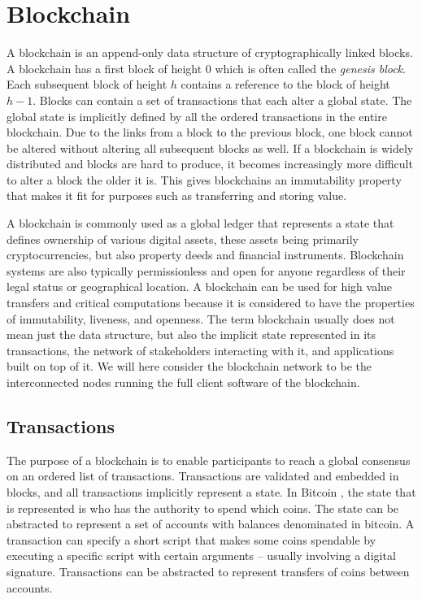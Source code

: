 \section{Blockchain}
\label{sec:blockchain}

A blockchain is an append-only data structure of cryptographically linked blocks. A blockchain has a first block of height $0$ which is often called the \emph{genesis block}. Each subsequent block of height $h$ contains a reference to the block of height $h-1$. Blocks can contain a set of transactions that each alter a global state. The global state is implicitly defined by all the ordered transactions in the entire blockchain. Due to the links from a block to the previous block, one block cannot be altered without altering all subsequent blocks as well. If a blockchain is widely distributed and blocks are hard to produce, it becomes increasingly more difficult to alter a block the older it is. This gives blockchains an immutability property that makes it fit for purposes such as transferring and storing value.

A blockchain is commonly used as a global ledger that represents a state that defines ownership of various digital assets, these assets being primarily cryptocurrencies, but also property deeds and financial instruments. Blockchain systems are also typically permissionless and open for anyone regardless of their legal status or geographical location. A blockchain can be used for high value transfers and critical computations because it is considered to have the properties of immutability, liveness, and openness. 
The term blockchain usually does not mean just the data structure, but also the implicit state represented in its transactions, the network of stakeholders interacting with it, and applications built on top of it. We will here consider the blockchain network to be the interconnected nodes running the full client software of the blockchain.

\subsection{Transactions}

The purpose of a blockchain is to enable participants to reach a global consensus on an ordered list of transactions. Transactions are validated and embedded in blocks, and all transactions implicitly represent a state. In Bitcoin \cite{bitcoinwhitepaper}, the state that is represented is who has the authority to spend which coins. The state can be abstracted to represent a set of accounts with balances denominated in bitcoin. A transaction can specify a short script that makes some coins spendable by executing a specific script with certain arguments – usually involving a digital signature. Transactions can be abstracted to represent transfers of coins between accounts.

